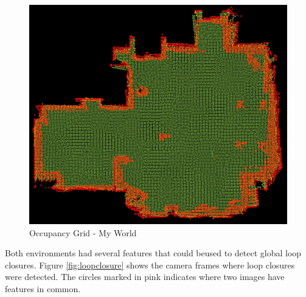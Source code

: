 \documentclass[10pt,journal,compsoc]{IEEEtran}
\begin{document}
\begin{figure}[H]
  \centering
  \includegraphics[width=.7\linewidth]{my_world_og.png}
  \caption{Occupancy Grid - My World}
  \label{fig:my-og}
\end{figure}


Both environments had several features that could beused to detect global loop closures. Figure \ref{fig:loopclosure} shows the camera frames where loop closures were detected. The circles marked in pink indicates where two images have features in common.
\end{document}
